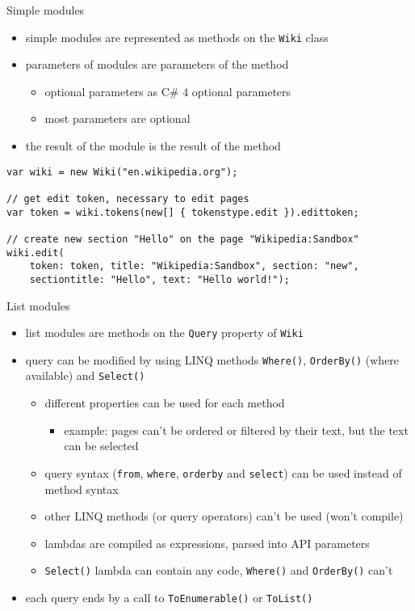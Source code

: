 \documentclass{beamer}
\begin{document}
\begin{frame}[fragile]{Simple modules}
\begin{itemize}
\item simple modules are represented as methods on the \lstinline{Wiki} class
\item parameters of modules are parameters of the method
\begin{itemize}
\item optional parameters as C\# 4 optional parameters
\item most parameters are optional
\end{itemize}
\item the result of the module is the result of the method
\end{itemize}

\medskip

\begin{adjustbox}{width=\textwidth,keepaspectratio}
\begin{lstlisting}
var wiki = new Wiki("en.wikipedia.org");

// get edit token, necessary to edit pages
var token = wiki.tokens(new[] { tokenstype.edit }).edittoken;

// create new section "Hello" on the page "Wikipedia:Sandbox"
wiki.edit(
    token: token, title: "Wikipedia:Sandbox", section: "new",
    sectiontitle: "Hello", text: "Hello world!");
\end{lstlisting}
\end{adjustbox}
\end{frame}

\begin{frame}{List modules}
\begin{itemize}
\item list modules are methods on the \lstinline{Query} property of \lstinline{Wiki}
\item query can be modified by using LINQ methods \lstinline{Where()}, \lstinline{OrderBy()} (where available) and \lstinline{Select()}
\begin{itemize}
\item different properties can be used for each method
\begin{itemize}
\item example: pages can't be ordered or filtered by their text, but the text can be selected
\end{itemize}
\item query syntax (\lstinline{from}, \lstinline{where}, \lstinline{orderby} and \lstinline{select}) can be used instead of method syntax
\item other LINQ methods (or query operators) can't be used (won't compile)
\item lambdas are compiled as expressions, parsed into API parameters
\item \lstinline{Select()} lambda can contain any code, \lstinline{Where()} and \lstinline{OrderBy()} can't
\end{itemize}
\item each query ends by a call to \lstinline{ToEnumerable()} or \lstinline{ToList()}
\end{itemize}
\end{frame}
\end{document}
